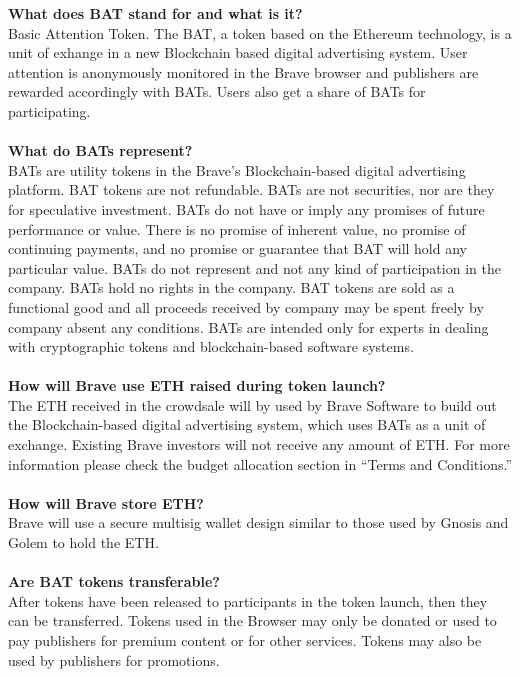 \documentclass[11pt]{article}
\begin{document}
\textbf{What does BAT stand for and what is it? }\\
Basic Attention Token. The BAT, a token based on the Ethereum technology, is a unit of exhange in a new Blockchain based digital advertising system. User attention is anonymously monitored in the Brave browser and publishers are rewarded accordingly with BATs. Users also get a share of BATs for participating. \\
\\
\textbf{What do BATs represent?}\\
BATs are utility tokens in the Brave's Blockchain-based digital advertising platform. BAT tokens are not refundable. BATs are not securities, nor are they for speculative investment. BATs do not have or imply any promises of future performance or value. There is no promise of inherent value, no promise of continuing payments, and no promise or guarantee that BAT will hold any particular value. BATs do not represent and not any kind of participation in the company. BATs  hold no rights in the company. BAT tokens are sold as a functional good and all proceeds received by company may be spent freely by company absent any conditions. BATs are intended only for experts in dealing with cryptographic tokens and blockchain-based software systems.\\ 
\\
\textbf{How will Brave use ETH raised during token launch? }\\
The ETH received in the crowdsale will by used by Brave Software to build out the Blockchain-based digital advertising system, which uses BATs as a unit of exchange. Existing Brave investors will not receive any amount of ETH. For more information please check the budget allocation section in “Terms and Conditions.” \\
\\
\textbf{How will Brave store ETH? }\\
Brave will use a secure multisig wallet design similar to those used by Gnosis and Golem to hold the ETH. \\
\\
\textbf{Are BAT tokens transferable? }\\
After tokens have been released to participants in the token launch, then they can be transferred. Tokens used in the Browser may only be donated or used to pay publishers for premium content or for other services. Tokens may also be used by publishers  for promotions.\\
\\
\end{document}
